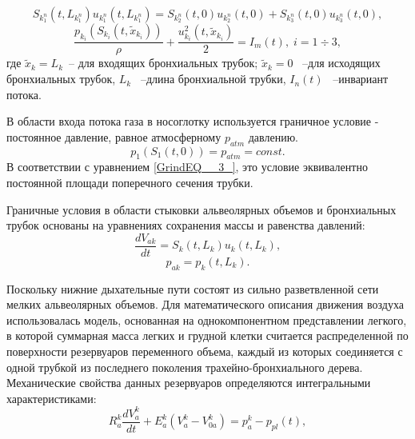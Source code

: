 \begin{equation} \label{GrindEQ__4_} 
S_{k_{1}^{n} } \left(t,L_{k_{1}^{n} } \right)u_{k_{1}^{n} } \left(t,L_{k_{1}^{n} } \right)=S_{k_{2}^{n} } \left(t,0\right)u_{k_{2}^{n} } \left(t,0\right)+S_{k_{3}^{n} } \left(t,0\right)u_{k_{3}^{n} } \left(t,0\right),  
\end{equation} 
\begin{equation} \label{GrindEQ__5_} 
\frac{p_{k_{i} } \left(S_{k_{i} } \left(t,\tilde{x}_{k_{i} } \right)\right)}{\rho } +\frac{u_{k_{i} }^{2} \left(t,\tilde{x}_{k_{i} } \right)}{2} =I_{m} \left(t\right),\; i=1\div 3, 
\end{equation} 
где $\tilde{x}_{k} =L_{k} $~-- для входящих бронхиальных трубок; $\tilde{x}_{k} =0$ ~--для исходящих бронхиальных трубок, $L_{k} $ ~--длина бронхиальной трубки, $I_{n} \left(t\right)$ ~--инвариант потока.

В области входа потока газа в носоглотку используется граничное условие - постоянное давление, равное атмосферному $p_{atm} $ давлению. 
\begin{equation} \label{GrindEQ__6_} 
p_{1} \left(S_{1} \left(t,0\right)\right)=p_{atm} =const.  
\end{equation} 
В соответствии с уравнением \eqref{GrindEQ__3_}, это условие эквивалентно постоянной площади поперечного сечения трубки.

Граничные условия в области стыковки альвеолярных объемов и бронхиальных трубок основаны на уравнениях сохранения массы и равенства давлений:
\begin{equation} \label{GrindEQ__7_} 
\frac{dV_{ak} }{dt} =S_{k} \left(t,L_{k} \right)u_{k} \left(t,L_{k} \right),  
\end{equation} 
\begin{equation} \label{GrindEQ__8_} 
p_{ak} =p_{k} \left(t,L_{k} \right).  
\end{equation} 

Поскольку нижние дыхательные пути состоят из сильно разветвленной сети мелких альвеолярных объемов. Для математического описания движения воздуха использовалась модель, основанная на однокомпонентном представлении легкого, в которой суммарная масса легких и грудной клетки считается распределенной по поверхности резервуаров переменного объема, каждый из которых соединяется с одной трубкой из последнего поколения трахейно-бронхиального дерева. Механические свойства данных резервуаров определяются интегральными характеристиками:
\begin{equation} 
\label{GrindEQ__9_} 
R_{a}^{k} \frac{dV_{a}^{k} }{dt} +E_{a}^{k} \left(V_{a}^{k} -V_{0a}^{k} \right)=p_{a}^{k} -p_{pl} \left(t\right), 
\end{equation} 

